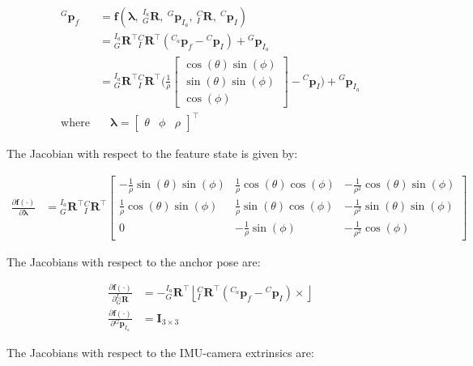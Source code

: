 \begin{align*} {}^{G}\mathbf{p}_f &= \mathbf f(\boldsymbol\lambda,~{}^{I_a}_{G}\mathbf{R},~{}^{G}\mathbf{p}_{I_a},~{}^{C}_{I}\mathbf{R},~{}^{C}\mathbf{p}_{I}) \\ &= {}^{I_a}_{G}\mathbf{R}^\top{}^{C}_{I}\mathbf{R}^\top({}^{C_a}\mathbf{p}_f-{}^{C}\mathbf{p}_{I}) + {}^{G}\mathbf{p}_{I_a} \\ &= {}^{I_a}_{G}\mathbf{R}^\top{}^{C}_{I}\mathbf{R}^\top\Bigg(\frac{1}{\rho}\begin{bmatrix} \cos(\theta)\sin(\phi) \\ \sin(\theta)\sin(\phi) \\ \cos(\phi) \end{bmatrix}-{}^{C}\mathbf{p}_{I}\Bigg) + {}^{G}\mathbf{p}_{I_a} \\ \text{where} &\quad \boldsymbol\lambda = \begin{bmatrix} \theta & \phi & \rho \end{bmatrix}^\top \end{align*}

The Jacobian with respect to the feature state is given by\+:

\begin{align*} \frac{\partial \mathbf f(\cdot)}{\partial \boldsymbol\lambda} &= {}^{I_a}_{G}\mathbf{R}^\top{}^{C}_{I}\mathbf{R}^\top \begin{bmatrix} -\frac{1}{\rho}\sin(\theta)\sin(\phi) & \frac{1}{\rho}\cos(\theta)\cos(\phi) & -\frac{1}{\rho^2}\cos(\theta)\sin(\phi) \\ \frac{1}{\rho}\cos(\theta)\sin(\phi) & \frac{1}{\rho}\sin(\theta)\cos(\phi) & -\frac{1}{\rho^2}\sin(\theta)\sin(\phi) \\ 0 & -\frac{1}{\rho}\sin(\phi) & -\frac{1}{\rho^2}\cos(\phi) \end{bmatrix} \end{align*}

The Jacobians with respect to the anchor pose are\+:

\begin{align*} \frac{\partial \mathbf f(\cdot)}{\partial {}^{I_a}_{G}\mathbf{R}} &= -{}^{I_a}_{G}\mathbf{R}^\top \left\lfloor{}^{C}_{I}\mathbf{R}^\top({}^{C_a}\mathbf{p}_f-{}^{C}\mathbf{p}_{I}) \times\right\rfloor \\ \frac{\partial \mathbf f(\cdot)}{\partial {}^{G}\mathbf{p}_{I_a}} &= \mathbf{I}_{3\times 3} \end{align*}

The Jacobians with respect to the I\+M\+U-\/camera extrinsics are\+:

